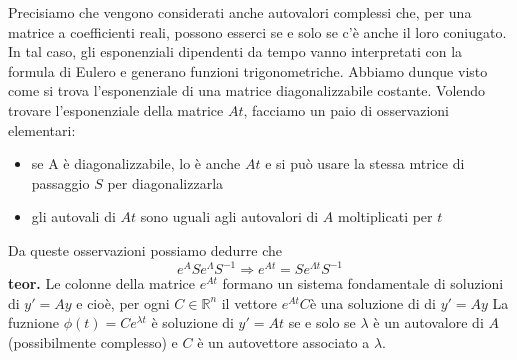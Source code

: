 \newline
Precisiamo che vengono considerati anche autovalori complessi che, per una matrice a coefficienti reali, possono esserci se e solo se c'è anche il loro coniugato. In tal caso, gli esponenziali dipendenti da tempo vanno interpretati con la formula di Eulero e generano funzioni trigonometriche.\newline
\newline
Abbiamo dunque visto come si trova l'esponenziale di una matrice diagonalizzabile costante. Volendo trovare l'esponenziale della matrice $At$, facciamo un paio di osservazioni elementari:
\begin{itemize}
    \item se A è diagonalizzabile, lo è anche $At$ e si può usare la stessa mtrice di passaggio $S$ per diagonalizzarla
    \item gli autovali di $At$ sono uguali agli autovalori di $A$ moltiplicati per $t$
\end{itemize}
Da queste osservazioni possiamo dedurre che
\[
    e^A  S e^{\Lambda}S^{-1} \Rightarrow  e^{At} = S e^{\Lambda t} S^{-1}
\]
\textbf{teor.} Le colonne della matrice $e^{At}$ formano un sistema fondamentale di soluzioni di $y' = Ay$ e cioè, per ogni $C \in \mathbb{R}^n$ il vettore $e^{At} C$è una soluzione di di $y'=Ay$\newline
\newline
La fuznione $\phi(t) = C e^{\lambda t} $ è soluzione di $y'=At$ se e solo se $\lambda$ è un autovalore di $A$ (possibilmente complesso) e $C$ è un autovettore associato a $\lambda$.